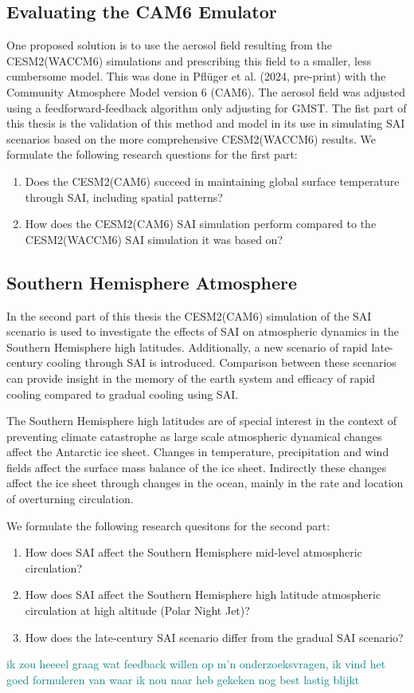 \subsection{Evaluating the CAM6 Emulator}
One proposed solution is to use the aerosol field resulting from the CESM2(WACCM6) simulations and prescribing this field to a smaller, less cumbersome model. This was done in Pflüger et al. (2024, pre-print) with the Community Atmosphere Model version 6 (CAM6). The aerosol field was adjusted using a feedforward-feedback algorithm only adjusting for GMST. The fist part of this thesis is the validation of this method and model in its use in simulating SAI scenarios based on the more comprehensive CESM2(WACCM6) results. 
We formulate the following research questions for the first part:

\begin{enumerate}
    \item Does the CESM2(CAM6) succeed in maintaining global surface temperature through SAI, including spatial patterns?
    \item How does the CESM2(CAM6) SAI simulation perform  compared to the CESM2(WACCM6) SAI simulation it was based on?
\end{enumerate}

\subsection{Southern Hemisphere Atmosphere}
In the second part of this thesis the CESM2(CAM6) simulation of the SAI scenario is used to investigate the effects of SAI on atmospheric dynamics in the Southern Hemisphere high latitudes. Additionally, a new scenario of rapid late-century cooling through SAI is introduced. Comparison between these scenarios can provide insight in the memory of the earth system and efficacy of rapid cooling compared to gradual cooling using SAI. 

The Southern Hemisphere high latitudes are of special interest in the context of preventing climate catastrophe as large scale atmospheric dynamical changes affect the Antarctic ice sheet. Changes in temperature, precipitation and wind fields affect the surface mass balance of the ice sheet. Indirectly these changes affect the ice sheet through changes in the ocean, mainly in the rate and location of overturning circulation. 

We formulate the following research quesitons for the second part:

\begin{enumerate}
    \item How does SAI affect the Southern Hemisphere mid-level atmospheric circulation?
    \item How does SAI affect the Southern Hemisphere high latitude atmospheric circulation at high altitude (Polar Night Jet)?
    \item How does the late-century SAI scenario differ from the gradual SAI scenario?
\end{enumerate}

\textcolor{teal}{ik zou heeeel graag wat feedback willen op m'n onderzoeksvragen, ik vind het goed formuleren van waar ik nou naar heb gekeken nog best lastig blijkt}